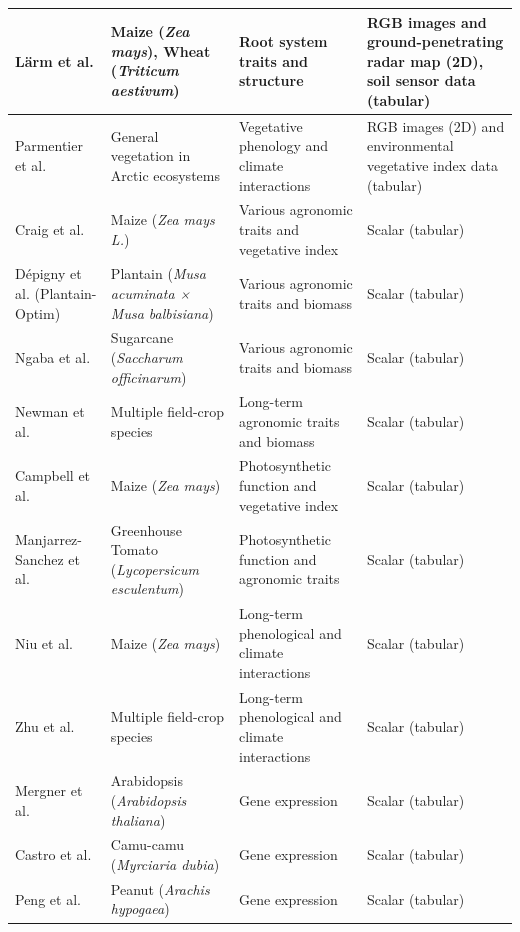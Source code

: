 \documentclass{article}
\begin{document}
\begin{table}
\begin{tabularx}{\textwidth}{@{\extracolsep{\fill}}p{}p{}X X@{\extracolsep{\fill}}}
\hline
Lärm et al. \cite{larm2023multi} & Maize (\textit{Zea mays}), Wheat (\textit{Triticum aestivum}) & Root system traits and structure & RGB images and ground-penetrating radar map (2D), soil sensor data (tabular) \\
\hline
Parmentier et al. \cite{essd-13-3593-2021} & General vegetation in Arctic ecosystems & Vegetative phenology and climate interactions & RGB images (2D) and environmental vegetative index data (tabular) \\
\hline
Craig et al. \cite{craig2022hyperspectral} & Maize (\textit{Zea mays L.}) & Various agronomic traits and vegetative index & Scalar (tabular) \\
\hline
D{\'e}pigny et al. (Plantain-Optim) \cite{DEPIGNY2018671} & Plantain (\textit{Musa acuminata × Musa balbisiana}) & Various agronomic traits and biomass & Scalar (tabular) \\
\hline
Ngaba et al. \cite{NGABA2023109244} & Sugarcane (\textit{Saccharum officinarum}) & Various agronomic traits and biomass & Scalar (tabular) \\
\hline
Newman et al. \cite{newman2021multiple} & Multiple field-crop species & Long-term agronomic traits and biomass & Scalar (tabular) \\
\hline
Campbell et al. \cite{CAMPBELL2021107600} & Maize (\textit{Zea mays}) & Photosynthetic function and vegetative index & Scalar (tabular) \\
\hline
Manjarrez-Sanchez et al. \cite{MANJARREZSANCHEZ2020106274} & Greenhouse Tomato (\textit{Lycopersicum esculentum}) & Photosynthetic function and agronomic traits & Scalar (tabular) \\
\hline
Niu et al. \cite{essd-14-2851-2022} & Maize (\textit{Zea mays}) & Long-term phenological and climate interactions & Scalar (tabular) \\
\hline
Zhu et al. \cite{essd-16-277-2024} & Multiple field-crop species & Long-term phenological and climate interactions & Scalar (tabular) \\
\hline
Mergner et al. \cite{mergner2020proteomic} & Arabidopsis (\textit{Arabidopsis thaliana}) & Gene expression & Scalar (tabular) \\
\hline
Castro et al. \cite{CASTRO2020105834} & Camu-camu (\textit{Myrciaria dubia}) & Gene expression & Scalar (tabular) \\
\hline
Peng et al. \cite{peng2024transcriptome} & Peanut (\textit{Arachis hypogaea}) & Gene expression & Scalar (tabular) \\
\bottomrule
\end{tabularx}
\end{table}
\end{document}
